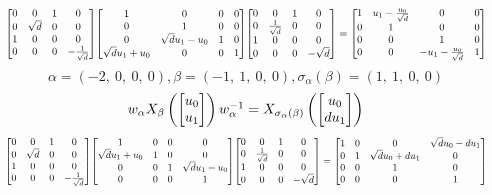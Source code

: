 \documentclass[11pt]{article}
\theoremstyle{definition}
\begin{document}
\[
\scaletoalign{\textwidth}{{\left[\begin{matrix}0 & 0 & 1 & 0\\0 & \sqrt{d} & 0 & 0\\1 & 0 & 0 & 0\\0 & 0 & 0 & - \frac{1}{\sqrt{d}}\end{matrix}\right]} {\left[\begin{matrix}1 & 0 & 0 & 0\\0 & 1 & 0 & 0\\0 & \sqrt{d} u_{1} - u_{0} & 1 & 0\\\sqrt{d} u_{1} + u_{0} & 0 & 0 & 1\end{matrix}\right]} {\left[\begin{matrix}0 & 0 & 1 & 0\\0 & \frac{1}{\sqrt{d}} & 0 & 0\\1 & 0 & 0 & 0\\0 & 0 & 0 & - \sqrt{d}\end{matrix}\right]} = {\left[\begin{matrix}1 & u_{1} - \frac{u_{0}}{\sqrt{d}} & 0 & 0\\0 & 1 & 0 & 0\\0 & 0 & 1 & 0\\0 & 0 & - u_{1} - \frac{u_{0}}{\sqrt{d}} & 1\end{matrix}\right]}}
\]
\[
\alpha = \left( -2, \  0, \  0, \  0\right), \beta = \left( -1, \  1, \  0, \  0\right), \sigma_{\alpha}(\beta) = \left( 1, \  1, \  0, \  0\right)
\]
\[
\scaletoalign{\textwidth}{w_{\alpha} X_{\beta}\left(\left[\begin{matrix}u_{0}\\u_{1}\end{matrix}\right]\right) w_{\alpha}^{-1} = X_{\sigma_{\alpha}\left(\beta\right)}\left(\left[\begin{matrix}u_{0}\\d u_{1}\end{matrix}\right]\right)}
\]
\[
\scaletoalign{\textwidth}{{\left[\begin{matrix}0 & 0 & 1 & 0\\0 & \sqrt{d} & 0 & 0\\1 & 0 & 0 & 0\\0 & 0 & 0 & - \frac{1}{\sqrt{d}}\end{matrix}\right]} {\left[\begin{matrix}1 & 0 & 0 & 0\\\sqrt{d} u_{1} + u_{0} & 1 & 0 & 0\\0 & 0 & 1 & \sqrt{d} u_{1} - u_{0}\\0 & 0 & 0 & 1\end{matrix}\right]} {\left[\begin{matrix}0 & 0 & 1 & 0\\0 & \frac{1}{\sqrt{d}} & 0 & 0\\1 & 0 & 0 & 0\\0 & 0 & 0 & - \sqrt{d}\end{matrix}\right]} = {\left[\begin{matrix}1 & 0 & 0 & \sqrt{d} u_{0} - d u_{1}\\0 & 1 & \sqrt{d} u_{0} + d u_{1} & 0\\0 & 0 & 1 & 0\\0 & 0 & 0 & 1\end{matrix}\right]}}
\]
\end{document}
